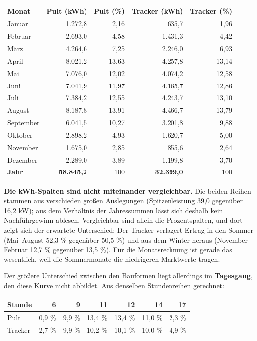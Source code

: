 \documentclass[
  a4paper,
  10pt]{article}
\begin{document}
\begin{longtable}[]{@{}lrrrr@{}}
\toprule\noalign{}
Monat & Pult (kWh) & Pult (\%) & Tracker (kWh) & Tracker (\%) \\
\midrule\noalign{}
\endhead
\bottomrule\noalign{}
\endlastfoot
Januar & 1.272,8 & 2,16 & 635,7 & 1,96 \\
Februar & 2.693,0 & 4,58 & 1.431,3 & 4,42 \\
März & 4.264,6 & 7,25 & 2.246,0 & 6,93 \\
April & 8.021,2 & 13,63 & 4.257,8 & 13,14 \\
Mai & 7.076,0 & 12,02 & 4.074,2 & 12,58 \\
Juni & 7.041,9 & 11,97 & 4.165,7 & 12,86 \\
Juli & 7.384,2 & 12,55 & 4.243,7 & 13,10 \\
August & 8.187,8 & 13,91 & 4.466,7 & 13,79 \\
September & 6.041,5 & 10,27 & 3.201,8 & 9,88 \\
Oktober & 2.898,2 & 4,93 & 1.620,7 & 5,00 \\
November & 1.675,0 & 2,85 & 855,6 & 2,64 \\
Dezember & 2.289,0 & 3,89 & 1.199,8 & 3,70 \\
\textbf{Jahr} & \textbf{58.845,2} & 100 & \textbf{32.399,0} & 100 \\
\end{longtable}

\textbf{Die kWh-Spalten sind nicht miteinander vergleichbar.} Die beiden
Reihen stammen aus verschieden großen Auslegungen (Spitzenleistung 39,0
gegenüber 16,2 kW); aus dem Verhältnis der Jahressummen lässt sich
deshalb kein Nachführgewinn ablesen. Vergleichbar sind allein die
Prozentspalten, und dort zeigt sich der erwartete Unterschied: Der
Tracker verlagert Ertrag in den Sommer (Mai--August 52,3 \% gegenüber
50,5 \%) und aus dem Winter heraus (November--Februar 12,7 \% gegenüber
13,5 \%). Für die Monatsrechnung ist gerade das wesentlich, weil die
Sommermonate die niedrigeren Marktwerte tragen.

Der größere Unterschied zwischen den Bauformen liegt allerdings im
\textbf{Tagesgang}, den diese Kurve nicht abbildet. Aus denselben
Stundenreihen gerechnet:

\begin{longtable}[]{@{}lrrrrrr@{}}
\toprule\noalign{}
Stunde & 6 & 9 & 11 & 12 & 14 & 17 \\
\midrule\noalign{}
\endhead
\bottomrule\noalign{}
\endlastfoot
Pult & 0,9 \% & 9,9 \% & 13,4 \% & 13,4 \% & 11,0 \% & 2,3 \% \\
Tracker & 2,7 \% & 9,9 \% & 10,2 \% & 10,1 \% & 10,0 \% & 4,9 \% \\
\end{longtable}
\end{document}

